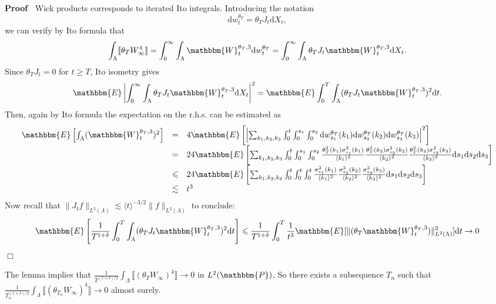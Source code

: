 \documentclass[11pt]{article}
\newcommand{\mathd}{\mathrm{d}}
\newenvironment{proof}{\noindent\textbf{Proof\ }}{\hspace*{\fill}$\Box$\medskip}
\begin{document}
\begin{proof}
  Wick products corresponds to iterated Ito integrals. Introducing the
  notation
  \[ \mathd w_t^{\theta_T} = \theta_T J_t \mathd X_t, \]
  we can verify by Ito formula that
  \[ \int_{\Lambda} \llbracket \theta_T W_{\infty}^4 \rrbracket =
     \int^{\infty}_0 \int_{\Lambda} \mathbbm{W}_t^{\theta_T, 3} \mathd
     w^{\theta_T}_t = \int^{\infty}_0 \int_{\Lambda} \theta_T J_t
     \mathbbm{W}_t^{\theta_T, 3} \mathd X_t . \]
  Since $\theta_T J_t = 0$ for $t \geqslant T$, Ito isometry gives
  \[ \mathbbm{E} \left| \int^{\infty}_0 \int_{\Lambda} \theta_T J_t
     \mathbbm{W}_t^{\theta_T, 3} \mathd X_t \right|^2 =\mathbbm{E} \int^T_0
     \int_{\Lambda} (\theta_T J_t \mathbbm{W}_t^{\theta_T, 3})^2 \mathd t. \]
  Then, again by Ito formula the expectation on the r.h.s. can be estimated as
  \[\begin{array}{lll}
    \mathbbm{E} \left[ \int_{\Lambda} (\mathbbm{W}_t^{\theta_T, 3})^2 \right]
    & = & 4\mathbbm{E} \left[ \left| \sum_{k_1, k_2, k_3} \int^t_0
    \int^{s_1}_0 \int^{s_2}_0 \mathd w_{s_1}^{\theta_T} (k_1) \mathd
    w_{s_2}^{\theta_T} (k_2) \mathd w^{\theta_T}_{s_3} (k_3) \right|^2
    \right]\\
    & = & 24\mathbbm{E} \left[ \sum_{k_1, k_2, k_3} \int^t_0 \int^{s_1}_0
    \int^{s_2}_0 \frac{\theta^2_T (k_1) \sigma^2_{s_1} (k_1)_{}}{\langle k_1
    \rangle^2} \frac{\theta_T^2 (k_2) \sigma^2_{s_2} (k_2)}{\langle k_2
    \rangle^2} \frac{\theta^2_T (k_3) \sigma^2_{s_3} (k_3)}{\langle k_3
    \rangle^2} \mathd s_1 \mathd s_2 \mathd s_3 \right]\\
    & \leqslant & 24\mathbbm{E} \left[ \sum_{k_1, k_2, k_3} \int^t_0 \int^t_0
    \int^t_0 \frac{\sigma^2_{s_1} (k_1)_{}}{\langle k_1 \rangle^2}
    \frac{\sigma^2_{s_2} (k_2)}{\langle k_2 \rangle^2} \frac{\sigma^2_{s_3}
    (k_3)}{\langle k_3 \rangle^2} \mathd s_1 \mathd s_2 \mathd s_3 \right]\\
    & \lesssim & t^3
  \end{array}
  \]
  Now recall that $\| J_t f \|_{L^2 (\Lambda)} \lesssim \langle t \rangle^{- 3
  / 2} \| f \|_{L^2 (\Lambda)}$ to conclude:
  \[ \mathbbm{E} \left[ \frac{1}{T^{1 + \delta}} \int^T_0 \int_{\Lambda}
     (\theta_T J_t \mathbbm{W}_t^{\theta_T, 3})^2 \mathd t \right] \leqslant
     \frac{1}{T^{1 + \delta}} \int^T_0 \frac{1}{t^3} \mathbbm{E} [\| (\theta_T
     \mathbbm{W}_t^{\theta_T, 3}) \|_{L^2 (\Lambda)}^2] \mathd t \rightarrow 0
  \]
\end{proof}

The lemma implies that $\frac{1}{T^{(1 + \delta) / 2}} \int_{\Lambda}
\llbracket (\theta_T W_{\infty})^4 \rrbracket \rightarrow 0$ in $L^2
(\mathbbm{P})$. So there exists a subsequence $T_n$ such that
$\frac{1}{T_n^{(1 + \delta) / 2}} \int_{\Lambda} \llbracket (\theta_{T_n}
W_{\infty})^4 \rrbracket \rightarrow 0$ almost surely.
\end{document}
